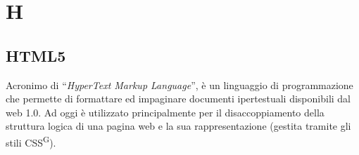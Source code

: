 \section{H}

\subsection{HTML5}
Acronimo di “\textit{HyperText Markup Language}”, è un linguaggio di programmazione che permette di formattare ed impaginare documenti ipertestuali disponibili dal web 1.0. Ad oggi è utilizzato principalmente per il disaccoppiamento della struttura logica di una pagina web e la sua rappresentazione (gestita tramite gli stili CSS\textsuperscript{G}). 

\clearpage